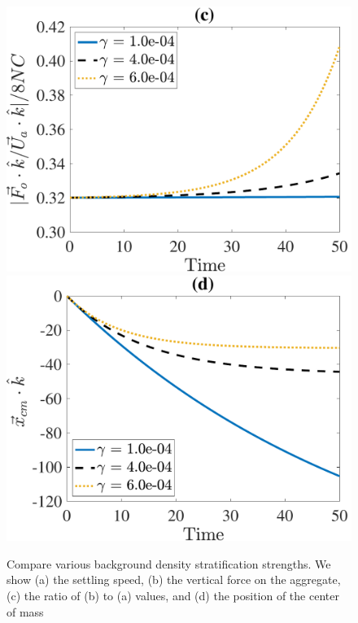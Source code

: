 \begin{figure}[h]
\begin{center}
		\includegraphics[scale=0.35]{./figures/fig_NC50_g_Fo3Ua_ratio}
		\includegraphics[scale=0.35]{./figures/fig_NC50_g_cm3_all}
	\caption{Compare various background density stratification strengths. We show (a) the settling speed, (b) the vertical force on the aggregate, (c) the ratio of (b) to (a) values, and (d) the position of the center of mass }
	\label{fig_NC50_gg}
\end{center}
\end{figure}
